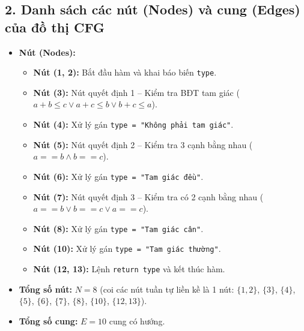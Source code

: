 \documentclass[11pt,a4paper]{article}
\begin{document}
\subsection*{2. Danh sách các nút (Nodes) và cung (Edges) của đồ thị CFG}
\begin{itemize}[noitemsep]
    \item \textbf{Nút (Nodes):}
    \begin{itemize}[noitemsep]
        \item \textbf{Nút (1, 2):} Bắt đầu hàm và khai báo biến \texttt{type}.
        \item \textbf{Nút (3):} Nút quyết định 1 -- Kiểm tra BĐT tam giác ($a + b \le c \lor a + c \le b \lor b + c \le a$).
        \item \textbf{Nút (4):} Xử lý gán \texttt{type = "Không phải tam giác"}.
        \item \textbf{Nút (5):} Nút quyết định 2 -- Kiểm tra 3 cạnh bằng nhau ($a == b \land b == c$).
        \item \textbf{Nút (6):} Xử lý gán \texttt{type = "Tam giác đều"}.
        \item \textbf{Nút (7):} Nút quyết định 3 -- Kiểm tra có 2 cạnh bằng nhau ($a == b \lor b == c \lor a == c$).
        \item \textbf{Nút (8):} Xử lý gán \texttt{type = "Tam giác cân"}.
        \item \textbf{Nút (10):} Xử lý gán \texttt{type = "Tam giác thường"}.
        \item \textbf{Nút (12, 13):} Lệnh \texttt{return type} và kết thúc hàm.
    \end{itemize}
    \item \textbf{Tổng số nút:} $N = 8$ (coi các nút tuần tự liền kề là 1 nút: $\{1,2\}$, $\{3\}$, $\{4\}$, $\{5\}$, $\{6\}$, $\{7\}$, $\{8\}$, $\{10\}$, $\{12,13\}$).
    \item \textbf{Tổng số cung:} $E = 10$ cung có hướng.
\end{itemize}
\end{document}

